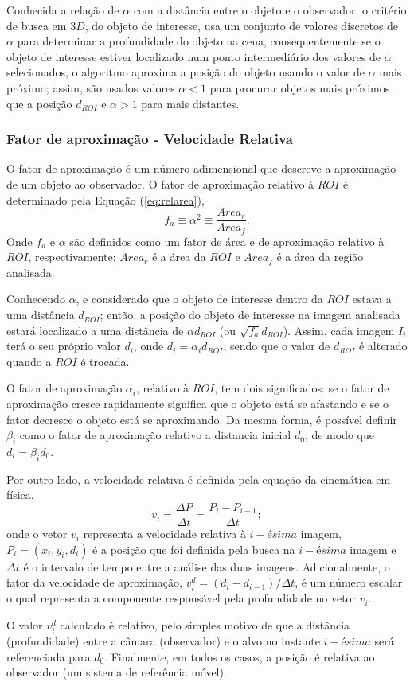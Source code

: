 Conhecida a relação de $\alpha$ com a distância entre o objeto e o observador; 
o critério de busca em $3D$, do objeto de interesse, usa um conjunto de valores 
discretos de $\alpha$ para determinar a profundidade do objeto na cena, 
consequentemente se o objeto de interesse estiver localizado num ponto intermediário dos valores
de $\alpha$ selecionados, o algoritmo aproxima a posição do objeto 
usando o valor de $\alpha$ mais próximo; assim, são usados valores $\alpha<1$
para procurar objetos mais próximos que a posição $d_{ROI}$ e $\alpha>1$ para mais distantes.



\subsubsection{Fator de aproximação - Velocidade Relativa}

O fator de aproximação é um número adimensional que descreve a
aproximação de um objeto ao observador.
O fator de aproximação relativo à $ROI$ é determinado pela Equação (\ref{eq:relarea}),
\begin{equation}\label{eq:relarea}
f_a \equiv \alpha^2 \equiv \frac{Area_r}{Area_f}.
\end{equation}
Onde $f_a$ e $\alpha$ são definidos como um fator de área e de aproximação relativo à $ROI$,
respectivamente; $Area_r$ é a área da $ROI$ e $Area_f$ é a área da região analisada.

Conhecendo $\alpha$, e considerado que o objeto de interesse dentro da $ROI$ estava a uma distância $d_{ROI}$; então,
a posição do objeto de interesse na imagem analisada 
estará localizado a uma distância de $\alpha d_{ROI}$ (ou $\sqrt{f_a} d_{ROI}$). Assim, cada  imagem $I_i$
terá o seu próprio  valor $d_i$, onde $d_i=\alpha_i d_{ROI}$, sendo que o valor de $d_{ROI}$
é alterado quando a $ROI$ é trocada.

O fator de aproximação $\alpha_i$, relativo à $ROI$, tem 
dois significados: se o fator de aproximação cresce rapidamente 
significa que o objeto está se afastando e se o fator decresce o objeto está se aproximando.
Da mesma forma, é possível definir $\beta_i$ como o fator de aproximação relativo
a distancia inicial $d_0$, de modo que $d_i=\beta_i d_0$.

Por outro lado, a velocidade relativa é definida pela equação da cinemática em física,
\begin{equation}
 v_i = \frac{\Delta P}{\Delta t}= \frac{P_i-P_{i-1}}{\Delta t};
\end{equation}
onde o vetor $v_i$ representa a velocidade relativa à $i-ésima$ imagem, $P_i=(x_i,y_i,d_i)$ é a posição que
foi definida pela busca na $i-ésima$ imagem e $\Delta t$ é o intervalo de tempo entre a análise das duas imagens.
Adicionalmente, o fator da velocidade de aproximação, $v^d_i=(d_i-d_{i-1})/{\Delta t}$, 
é um número escalar o qual representa a componente
responsável pela profundidade no vetor $v_i$.

O valor $v^d_i$ calculado é relativo, pelo simples motivo de que a distância (profundidade) entre a câmara 
(observador) e o alvo no instante $i-ésima$ será referenciada para $d_0$. 
Finalmente, em todos os casos, a posição é 
relativa ao observador (um sistema de referência móvel).

